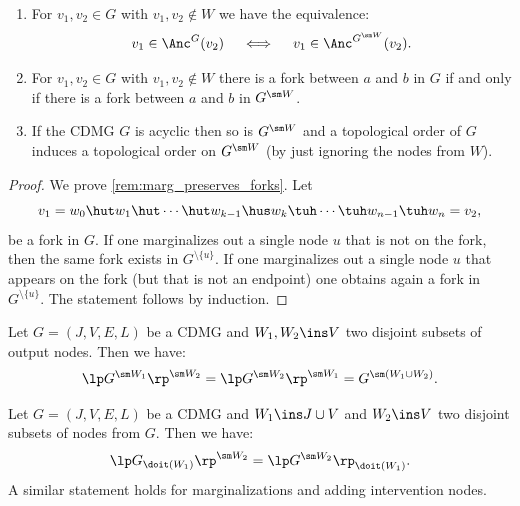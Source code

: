\begin{Rem}\label{rem:marg_preserves_ancestors_forks_acyclicity}
    \begin{enumerate}
        \item For $v_1,v_2 \in G$ with $v_1,v_2 \notin W$ we have the equivalence:
            \[ v_1 \in \Anc^G(v_2)\quad \iff \quad v_1 \in \Anc^{G^{\sm W}}(v_2).   \]
          \item For $v_1,v_2 \in G$ with $v_1,v_2 \notin W$ there is a fork between $a$ and $b$ in $G$ if and only if there is a fork between $a$ and $b$ in $G^{\sm W}$.\label{rem:marg_preserves_forks}
        \item If the CDMG $G$ is acyclic then so is $G^{\sm W}$ and a topological order of $G$ induces a 
            topological order on $G^{\sm W}$ (by just ignoring the nodes from $W$).
    \end{enumerate}
\end{Rem}
\begin{proof}
  We prove \ref{rem:marg_preserves_forks}.
  Let \[v_1=w_0 \hut w_1 \hut  \cdots \hut w_{k-1} \hus w_k  \tuh \cdots \tuh w_{n-1} \tuh w_n=v_2,\]
     be a fork in $G$. If one marginalizes out a single node $u$ that is not on the fork,
     then the same fork exists in $G^{\setminus\{u\}}$. If one marginalizes out a single node
     $u$ that appears on the fork (but that is not an endpoint) one obtains again a fork in $G^{\setminus\{u\}}$. 
     The statement follows by induction.
\end{proof}

\begin{Lem}\label{marginalizations-commute}
      Let $G=(J,V,E,L)$ be a CDMG and $W_1, W_2 \ins V$ two disjoint subsets of output nodes. 
      Then we have:
      \[ \lp G^{\sm W_1} \rp^{\sm W_2} = \lp G^{\sm W_2} \rp^{\sm W_1} =  G^{\sm (W_1 \cup W_2)}. \]
\end{Lem}

\begin{Lem}
      Let $G=(J,V,E,L)$ be a CDMG and $W_1 \ins J \cup V$ and $W_2 \ins V$ two disjoint subsets of nodes from $G$.
      Then we have:
      \[ \lp G_{\doit(W_1)} \rp^{\sm W_2} = \lp G^{\sm W_2} \rp_{\doit(W_1)}. \]
      A similar statement holds for marginalizations and adding intervention nodes.
\end{Lem}

